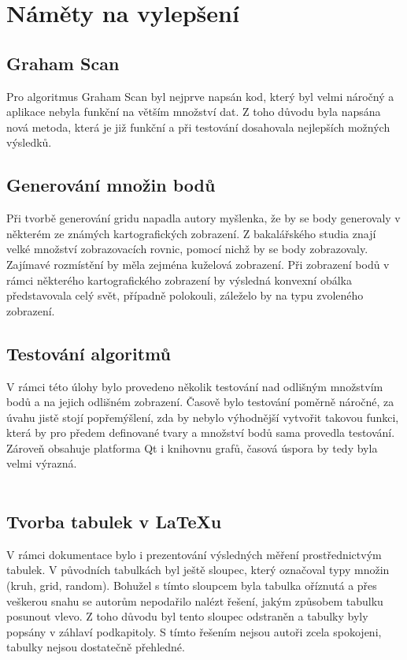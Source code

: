 \documentclass[a4paper, 12pt]{article}
\begin{document}
\section{Náměty na vylepšení}
\subsection{Graham Scan}
Pro algoritmus Graham Scan byl nejprve napsán kod, který byl velmi náročný a aplikace nebyla funkční na větším množství dat. Z toho důvodu byla napsána nová metoda, která je již funkční a při testování dosahovala nejlepších možných výsledků.

\subsection{Generování množin bodů}
Při tvorbě generování gridu napadla autory myšlenka, že by se body generovaly v některém ze známých kartografických zobrazení. Z bakalářského studia znají velké množství zobrazovacích rovnic, pomocí nichž by se body zobrazovaly. Zajímavé rozmístění by měla zejména kuželová zobrazení. Při zobrazení bodů v rámci některého kartografického zobrazení by výsledná konvexní obálka představovala celý svět, případně polokouli, záleželo by na typu zvoleného zobrazení.

\subsection{Testování algoritmů}
V rámci této úlohy bylo provedeno několik testování nad odlišným množstvím bodů a na jejich odlišném zobrazení. Časově bylo testování poměrně náročné, za úvahu jistě stojí popřemýšlení, zda by nebylo výhodnější vytvořit takovou funkci, která by pro předem definované tvary a množství bodů sama provedla testování. Zároveň obsahuje platforma Qt i knihovnu grafů, časová úspora by tedy byla velmi výrazná.\\
\\

\subsection{Tvorba tabulek v LaTeXu}
V rámci dokumentace bylo i prezentování výsledných měření prostřednictvým tabulek. V původních tabulkách byl ještě sloupec, který označoval typy množin (kruh, grid, random). Bohužel s tímto sloupcem byla tabulka oříznutá a přes veškerou snahu se autorům nepodařilo nalézt řešení, jakým způsobem tabulku posunout vlevo. Z toho důvodu byl tento sloupec odstraněn a tabulky byly popsány v záhlaví podkapitoly. S tímto řešením nejsou autoři zcela spokojeni, tabulky nejsou dostatečně přehledné. 
\end{document}
